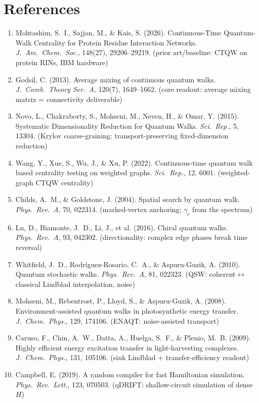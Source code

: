 \documentclass[11pt,a4paper]{article}
\newcommand{\note}[1]{{\color{grey}\small #1}}
\begin{document}
\section{References}
{\footnotesize
\begin{enumerate}[leftmargin=1.6em,itemsep=1pt]
\item Mohtashim, S.~I., Sajjan, M., \& Kais, S. (2026). Continuous-Time Quantum-Walk Centrality for Protein Residue Interaction Networks. \emph{J.\ Am.\ Chem.\ Soc.}, 148(27), 29206--29219. \note{(prior art/baseline: CTQW on protein RINs, IBM hardware)}
\item Godsil, C. (2013). Average mixing of continuous quantum walks. \emph{J.\ Comb.\ Theory Ser.\ A}, 120(7), 1649--1662. \note{(core readout: average mixing matrix = connectivity deliverable)}
\item Novo, L., Chakraborty, S., Mohseni, M., Neven, H., \& Omar, Y. (2015). Systematic Dimensionality Reduction for Quantum Walks. \emph{Sci.\ Rep.}, 5, 13304. \note{(Krylov coarse-graining: transport-preserving fixed-dimension reduction)}
\item Wang, Y., Xue, S., Wu, J., \& Xu, P. (2022). Continuous-time quantum walk based centrality testing on weighted graphs. \emph{Sci.\ Rep.}, 12, 6001. \note{(weighted-graph CTQW centrality)}
\item Childs, A.~M., \& Goldstone, J. (2004). Spatial search by quantum walk. \emph{Phys.\ Rev.\ A}, 70, 022314. \note{(marked-vertex anchoring; $\gamma_c$ from the spectrum)}
\item Lu, D., Biamonte, J.~D., Li, J., et al. (2016). Chiral quantum walks. \emph{Phys.\ Rev.\ A}, 93, 042302. \note{(directionality: complex edge phases break time reversal)}
\item Whitfield, J.~D., Rodr\'iguez-Rosario, C.~A., \& Aspuru-Guzik, A. (2010). Quantum stochastic walks. \emph{Phys.\ Rev.\ A}, 81, 022323. \note{(QSW: coherent$\leftrightarrow$classical Lindblad interpolation, noise)}
\item Mohseni, M., Rebentrost, P., Lloyd, S., \& Aspuru-Guzik, A. (2008). Environment-assisted quantum walks in photosynthetic energy transfer. \emph{J.\ Chem.\ Phys.}, 129, 174106. \note{(ENAQT: noise-assisted transport)}
\item Caruso, F., Chin, A.~W., Datta, A., Huelga, S.~F., \& Plenio, M.~B. (2009). Highly efficient energy excitation transfer in light-harvesting complexes. \emph{J.\ Chem.\ Phys.}, 131, 105106. \note{(sink Lindblad + transfer-efficiency readout)}
\item Campbell, E. (2019). A random compiler for fast Hamiltonian simulation. \emph{Phys.\ Rev.\ Lett.}, 123, 070503. \note{(qDRIFT: shallow-circuit simulation of dense $H$)}

\end{enumerate}}
\end{document}
